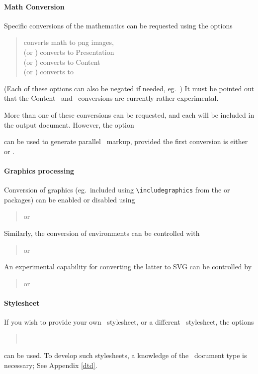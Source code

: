 \documentclass{report}
\begin{document}
\paragraph{Math Conversion}
Specific conversions of the mathematics can be requested
using the options
\begin{quote}
    converts math to png images,\\
  (or ) converts to Presentation \MathML\\
  (or ) converts to Content \MathML\\
  (or ) converts to \OpenMath
\end{quote}
(Each of these options can also be negated if needed, eg.~)
It must be pointed out that the Content \MathML\ and \OpenMath\
conversions are currently rather experimental.

More than one of these conversions can be requested, and
each will be included in the output document.
However, the option
\begin{quote}
\end{quote}
can be used to generate parallel \MathML\ markup, provided the first
conversion is either \code{--pmml} or \code{--cmml}.

\paragraph[Graphics]{Graphics processing}
Conversion of graphics (eg.~included using \verb|\includegraphics| from
the \code{graphics} or \code{graphicx} packages) can be enabled or disabled
using
\begin{quote}
  or 
\end{quote}
Similarly, the conversion of  environments can be controlled with
\begin{quote}
  or 
\end{quote}
An experimental capability for converting the latter to \textsc{SVG} can be
controlled by
\begin{quote}
  or 
\end{quote}

\paragraph{Stylesheet}
If you wish to provide your own \XSLT\ stylesheet, or
a different \CSS\ stylesheet, the options 
\begin{quote}
\\
\end{quote}
 can be used.  To develop such stylesheets, a knowledge
of the \LaTeXML\ document type is necessary; See Appendix \ref{dtd}.
\end{document}
